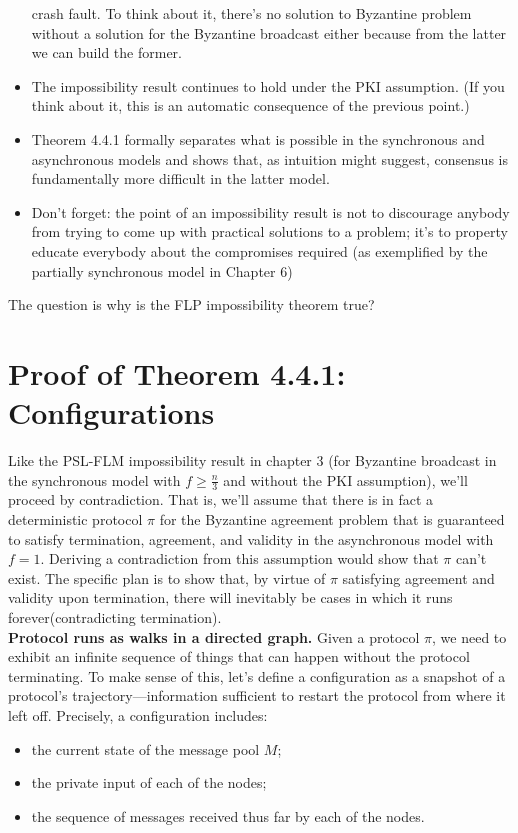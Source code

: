 \begin{itemize}
    crash fault. To think about it, there's no solution to Byzantine problem without a solution for the Byzantine broadcast either because from the latter we can build the former.
    \item The impossibility result continues to hold under the PKI assumption. (If you think about it, this is an automatic consequence of the previous point.)
    \item Theorem 4.4.1 formally separates what is possible in the synchronous and asynchronous
    models and shows that, as intuition might suggest, consensus is fundamentally more
    difficult in the latter model.
    \item Don’t forget: the point of an impossibility result is not to discourage anybody from
    trying to come up with practical solutions to a problem; it’s to property educate
    everybody about the compromises required (as exemplified by the partially synchronous
    model in Chapter 6)
\end{itemize}

The question is why is the FLP impossibility theorem true?

\section{Proof of Theorem 4.4.1: Configurations}
Like the PSL-FLM impossibility result in chapter 3 (for Byzantine broadcast in the synchronous model with $f \geq \frac{n}{3}$ and without the PKI assumption), we’ll proceed by contradiction. That is, we’ll assume that there is in fact a deterministic protocol $\pi$ for the Byzantine
agreement problem that is guaranteed to satisfy termination, agreement, and validity in
the asynchronous model with $f = 1$. Deriving a contradiction from this assumption would
show that $\pi$ can’t exist. The specific plan is to show that, by virtue of $\pi$ satisfying agreement and validity upon termination, there will inevitably be cases in which it runs forever(contradicting termination).\\

\noindent
\textbf{Protocol runs as walks in a directed graph.} Given a protocol $\pi$, we need to exhibit
an infinite sequence of things that can happen without the protocol terminating. To make
sense of this, let’s define a configuration as a snapshot of a protocol’s trajectory—information
sufficient to restart the protocol from where it left off. Precisely, a configuration includes:
\begin{itemize}
    \item the current state of the message pool $M$;
    \item the private input of each of the nodes;
    \item the sequence of messages received thus far by each of the nodes.
\end{itemize}

